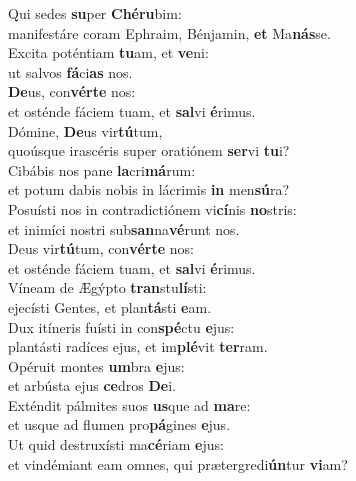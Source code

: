 \evenverse Qui sedes \textbf{su}per \textbf{Ché}\textbf{ru}bim:~\*\\
\evenverse manifestáre coram Ephraim, Bénjamin, \textbf{et} Ma\textbf{nás}se.\\
\oddverse Excita poténtiam \textbf{tu}am, et \textbf{ve}ni:~\*\\
\oddverse ut salvos \textbf{fá}ci\textbf{as} nos.\\
\evenverse \textbf{De}us, con\textbf{vér}\textbf{te} nos:~\*\\
\evenverse et osténde fáciem tuam, et \textbf{sal}vi \textbf{é}rimus.\\
\oddverse Dómine, \textbf{De}us vir\textbf{tú}tum,~\*\\
\oddverse quoúsque irascéris super oratiónem \textbf{ser}vi \textbf{tu}i?\\
\evenverse Cibábis nos pane \textbf{la}cri\textbf{má}rum:~\*\\
\evenverse et potum dabis nobis in lácrimis \textbf{in} men\textbf{sú}ra?\\
\oddverse Posuísti nos in contradictiónem vi\textbf{cí}nis \textbf{no}stris:~\*\\
\oddverse et inimíci nostri sub\textbf{san}na\textbf{vé}runt nos.\\
\evenverse Deus vir\textbf{tú}tum, con\textbf{vér}\textbf{te} nos:~\*\\
\evenverse et osténde fáciem tuam, et \textbf{sal}vi \textbf{é}rimus.\\
\oddverse Víneam de Ægýpto \textbf{tran}stu\textbf{lí}sti:~\*\\
\oddverse ejecísti Gentes, et plan\textbf{tá}sti \textbf{e}am.\\
\evenverse Dux itíneris fuísti in con\textbf{spé}ctu \textbf{e}jus:~\*\\
\evenverse plantásti radíces ejus, et im\textbf{plé}vit \textbf{ter}ram.\\
\oddverse Opéruit montes \textbf{um}bra \textbf{e}jus:~\*\\
\oddverse et arbústa ejus \textbf{ce}dros \textbf{De}i.\\
\evenverse Exténdit pálmites suos \textbf{us}que ad \textbf{ma}re:~\*\\
\evenverse et usque ad flumen pro\textbf{pá}gines \textbf{e}jus.\\
\oddverse Ut quid destruxísti ma\textbf{cé}riam \textbf{e}jus:~\*\\
\oddverse et vindémiant eam omnes, qui prætergredi\textbf{ún}tur \textbf{vi}am?\\
